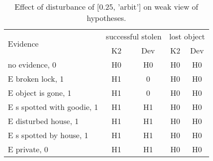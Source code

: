 \begin{table}\begin{tabular}{l|cc|cc}\toprule\multirow{2}{*}{Evidence} & \multicolumn{2}{c}{successful stolen}& \multicolumn{2}{c}{lost object}\\& {K2} & {Dev}& {K2} & {Dev}\\\midrule
no evidence, 0 & H0&H0&H0&H0\\E broken lock, 1 & \cellcolor{Bittersweet}H1&\cellcolor{Bittersweet}0&H0&H0\\E object is gone, 1 & \cellcolor{Bittersweet}H1&\cellcolor{Bittersweet}0&H0&H0\\E s spotted with goodie, 1 & H1&H1&H0&H0\\E disturbed house, 1 & H1&H1&H0&H0\\E s spotted by house, 1 & H1&H1&H0&H0\\E private, 0 & H1&H1&H0&H0\\\bottomrule\end{tabular}\caption{Effect of disturbance of [0.25, 'arbit'] on weak view of hypotheses.}\end{table}